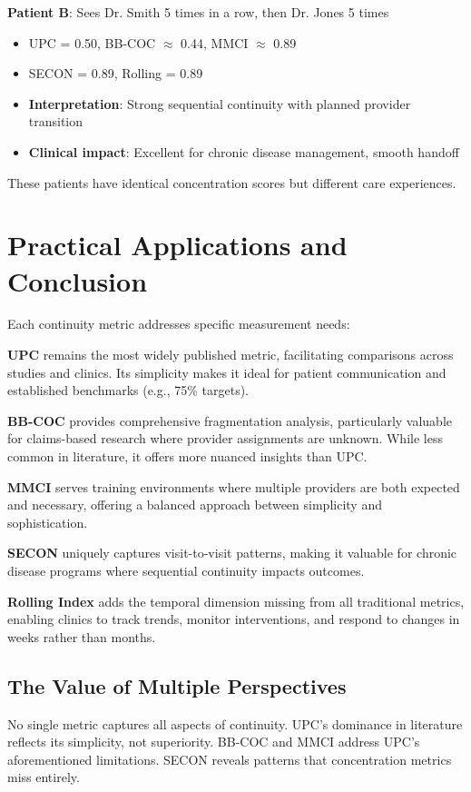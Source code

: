 \documentclass[11pt,a4paper]{article}
\begin{document}
\textbf{Patient B}: Sees Dr. Smith 5 times in a row, then Dr. Jones 5 times
\begin{itemize}
\item UPC = 0.50, BB-COC $\approx$ 0.44, MMCI $\approx$ 0.89
\item SECON = 0.89, Rolling = 0.89
\item \textbf{Interpretation}: Strong sequential continuity with planned provider transition
\item \textbf{Clinical impact}: Excellent for chronic disease management, smooth handoff
\end{itemize}

These patients have identical concentration scores but different care experiences. 

\section{Practical Applications and Conclusion}

Each continuity metric addresses specific measurement needs:

\textbf{UPC} remains the most widely published metric, facilitating comparisons across studies and clinics. Its simplicity makes it ideal for patient communication and established benchmarks (e.g., 75\% targets).

\textbf{BB-COC} provides comprehensive fragmentation analysis, particularly valuable for claims-based research where provider assignments are unknown. While less common in literature, it offers more nuanced insights than UPC.

\textbf{MMCI} serves training environments where multiple providers are both expected and necessary, offering a balanced approach between simplicity and sophistication.

\textbf{SECON} uniquely captures visit-to-visit patterns, making it valuable for chronic disease programs where sequential continuity impacts outcomes.

\textbf{Rolling Index} adds the temporal dimension missing from all traditional metrics, enabling clinics to track trends, monitor interventions, and respond to changes in weeks rather than months.

\subsection{The Value of Multiple Perspectives}

No single metric captures all aspects of continuity. UPC's dominance in literature reflects its simplicity, not superiority. BB-COC and MMCI address UPC's aforementioned limitations. SECON reveals patterns that concentration metrics miss entirely.
\end{document}
